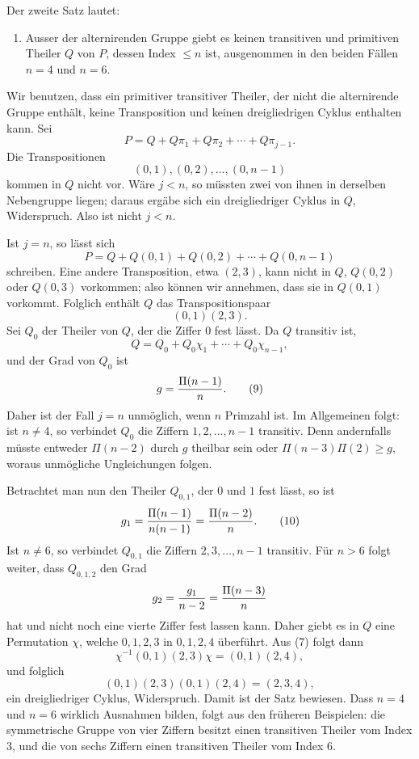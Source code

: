 \documentclass[11pt]{article}
\begin{document}
Der zweite Satz lautet:
\begin{enumerate}[label=\Roman*.,leftmargin=2.4em,start=2]
\item Ausser der alternirenden Gruppe giebt es keinen transitiven und primitiven Theiler $Q$ von $P$, dessen Index $\le n$ ist, ausgenommen in den beiden Fällen $n=4$ und $n=6$.
\end{enumerate}
Wir benutzen, dass ein primitiver transitiver Theiler, der nicht die alternirende Gruppe enthält, keine Transposition und keinen dreigliedrigen Cyklus enthalten kann. Sei
\begin{equation}
P=Q+Q\pi_1+Q\pi_2+\cdots+Q\pi_{j-1}.
\tag{4}
\end{equation}
Die Transpositionen
\begin{equation}
(0,1),(0,2),\ldots,(0,n-1)
\tag{5}
\end{equation}
kommen in $Q$ nicht vor. Wäre $j<n$, so müssten zwei von ihnen in derselben Nebengruppe liegen; daraus ergäbe sich ein dreigliedriger Cyklus in $Q$, Widerspruch. Also ist nicht $j<n$.

Ist $j=n$, so lässt sich
\begin{equation}
P=Q+Q(0,1)+Q(0,2)+\cdots+Q(0,n-1)
\tag{6}
\end{equation}
schreiben. Eine andere Transposition, etwa $(2,3)$, kann nicht in $Q$, $Q(0,2)$ oder $Q(0,3)$ vorkommen; also können wir annehmen, dass sie in $Q(0,1)$ vorkommt. Folglich enthält $Q$ das Transpositionspaar
\begin{equation}
(0,1)(2,3).
\tag{7}
\end{equation}
Sei $Q_0$ der Theiler von $Q$, der die Ziffer $0$ fest lässt. Da $Q$ transitiv ist,
\begin{equation}
Q=Q_0+Q_0\chi_1+\cdots+Q_0\chi_{n-1},
\tag{8}
\end{equation}
und der Grad von $Q_0$ ist
\begin{equation}
g={\Pi(n-1)\over n}.
\tag{9}
\end{equation}
Daher ist der Fall $j=n$ unmöglich, wenn $n$ Primzahl ist. Im Allgemeinen folgt: ist $n\ne4$, so verbindet $Q_0$ die Ziffern $1,2,
\ldots,n-1$ transitiv. Denn andernfalls müsste entweder $\Pi(n-2)$ durch $g$ theilbar sein oder $\Pi(n-3)\Pi(2)\ge g$, woraus unmögliche Ungleichungen folgen.

Betrachtet man nun den Theiler $Q_{0,1}$, der $0$ und $1$ fest lässt, so ist
\begin{equation}
g_1={\Pi(n-1)\over n(n-1)}={\Pi(n-2)\over n}.
\tag{10}
\end{equation}
Ist $n\ne6$, so verbindet $Q_{0,1}$ die Ziffern $2,3,
\ldots,n-1$ transitiv. Für $n>6$ folgt weiter, dass $Q_{0,1,2}$ den Grad
\[
g_2={g_1\over n-2}={\Pi(n-3)\over n}
\]
hat und nicht noch eine vierte Ziffer fest lassen kann. Daher giebt es in $Q$ eine Permutation $\chi$, welche $0,1,2,3$ in $0,1,2,4$ überführt. Aus (7) folgt dann
\[
\chi^{-1}(0,1)(2,3)\chi=(0,1)(2,4),
\]
und folglich
\[
(0,1)(2,3)(0,1)(2,4)=(2,3,4),
\]
ein dreigliedriger Cyklus, Widerspruch. Damit ist der Satz bewiesen. Dass $n=4$ und $n=6$ wirklich Ausnahmen bilden, folgt aus den früheren Beispielen: die symmetrische Gruppe von vier Ziffern besitzt einen transitiven Theiler vom Index $3$, und die von sechs Ziffern einen transitiven Theiler vom Index $6$.
\end{document}
